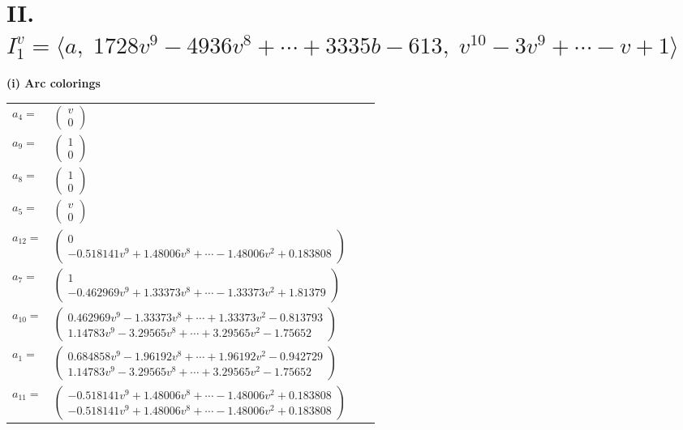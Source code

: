 \documentclass[1p]{elsarticle_modified}
\theoremstyle{definition}
\begin{document}
\centering \section*{II. $I^v_{1}= \langle a,\;1728 v^9-4936 v^8+\cdots+3335 b-613,\;v^{10}-3 v^9+\cdots- v+1 \rangle$}
\flushleft \textbf{(i) Arc colorings}\\
\begin{tabular}{m{7pt} m{180pt} m{7pt} m{180pt} }
\flushright $a_{4}=$&$\begin{pmatrix}v\\0\end{pmatrix}$ \\
\flushright $a_{9}=$&$\begin{pmatrix}1\\0\end{pmatrix}$ \\
\flushright $a_{8}=$&$\begin{pmatrix}1\\0\end{pmatrix}$ \\
\flushright $a_{5}=$&$\begin{pmatrix}v\\0\end{pmatrix}$ \\
\flushright $a_{12}=$&$\begin{pmatrix}0\\-0.518141 v^{9}+1.48006 v^{8}+\cdots-1.48006 v^{2}+0.183808\end{pmatrix}$ \\
\flushright $a_{7}=$&$\begin{pmatrix}1\\-0.462969 v^{9}+1.33373 v^{8}+\cdots-1.33373 v^{2}+1.81379\end{pmatrix}$ \\
\flushright $a_{10}=$&$\begin{pmatrix}0.462969 v^{9}-1.33373 v^{8}+\cdots+1.33373 v^{2}-0.813793\\1.14783 v^{9}-3.29565 v^{8}+\cdots+3.29565 v^{2}-1.75652\end{pmatrix}$ \\
\flushright $a_{1}=$&$\begin{pmatrix}0.684858 v^{9}-1.96192 v^{8}+\cdots+1.96192 v^{2}-0.942729\\1.14783 v^{9}-3.29565 v^{8}+\cdots+3.29565 v^{2}-1.75652\end{pmatrix}$ \\
\flushright $a_{11}=$&$\begin{pmatrix}-0.518141 v^{9}+1.48006 v^{8}+\cdots-1.48006 v^{2}+0.183808\\-0.518141 v^{9}+1.48006 v^{8}+\cdots-1.48006 v^{2}+0.183808\end{pmatrix}$ \\

\end{tabular}
\end{document}
